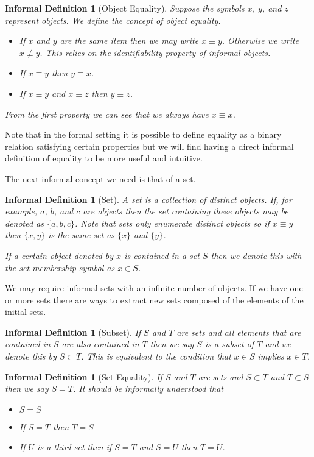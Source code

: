 \documentclass[12pt]{article}
\theoremstyle{break}
\theoremstyle{break}
\theoremstyle{break}
\theoremstyle{break}
\theoremstyle{break}
\newtheorem{informal definition}[definition]{Informal Definition}
\begin{document}
\begin{informal definition}[Object Equality]
Suppose the symbols $x$, $y$, and $z$ represent objects.
We define the concept of object equality.
\begin{itemize}
\item{If $x$ and $y$ are the same item then we may write $x\equiv y$. Otherwise we write $x\not \equiv y$. This relies on the identifiability property of informal objects.}
\item{If $x\equiv y$ then $y\equiv x$.}
\item{If $x\equiv y$ and $x\equiv z$ then $y\equiv z$.}
\end{itemize}
From the first property we can see that we always have $x\equiv x$.
\end{informal definition}
Note that in the formal setting it is possible to define equality as a binary relation satisfying certain properties but we will find having a direct informal definition of equality to be more useful and intuitive.

The next informal concept we need is that of a set.
\begin{informal definition}[Set]
A set is a collection of distinct objects.
If, for example, $a$, $b$, and $c$ are objects then the set containing these objects may be denoted as $\{a, b, c\}$.
Note that sets only enumerate \textit{distinct} objects so if $x\equiv y$ then $\{x, y\}$ is the same set as $\{x\}$ and $\{y\}$.

If a certain object denoted by $x$ is contained in a set $S$ then we denote this with the set membership symbol as $x\in S$.
\end{informal definition}
We may require informal sets with an infinite number of objects.
If we have one or more sets there are ways to extract new sets composed of the elements of the initial sets.

\begin{informal definition}[Subset]
If $S$ and $T$ are sets and all elements that are contained in $S$ are also contained in $T$ then we say $S$ is a subset of $T$ and we denote this by $S\subset T$.
This is equivalent to the condition that $x\in S$ implies $x\in T$.
\end{informal definition}

\begin{informal definition}[Set Equality]
If $S$ and $T$ are sets and $S\subset T$ and $T\subset S$ then we say $S=T$.
It should be informally understood that
\begin{itemize}
\item{$S=S$}
\item{If $S=T$ then $T=S$}
\item{If $U$ is a third set then if $S=T$ and $S=U$ then $T=U$.}
\end{itemize}
\end{informal definition}
\end{document}
